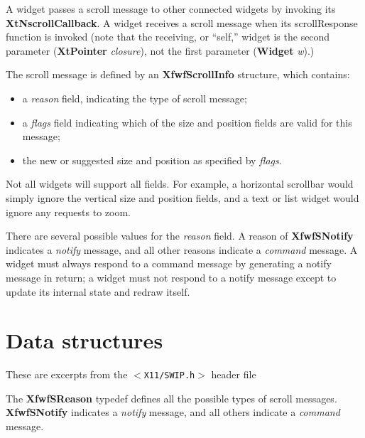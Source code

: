 A widget passes a scroll message to other connected widgets by
invoking its {\bf XtNscrollCallback}.  A widget receives a scroll message
when its scrollResponse function is invoked (note that the receiving,
or ``self,'' widget is the second parameter ({\bf XtPointer} {\it closure}\/),
not the first parameter ({\bf Widget} {\it w}\/).)

The scroll message is defined by an {\bf XfwfScrollInfo} structure, which
contains:

\begin{itemize}

\item
a {\it reason}\/ field, indicating the type of scroll message;

\item
a {\it flags}\/ field indicating which of the size and position
fields are valid for this message;

\item
the new or suggested size and position as specified by {\it flags}.

\end{itemize}

Not all widgets will support all fields.  For example, a horizontal
scrollbar would simply ignore the vertical size and position fields,
and a text or list widget would ignore any requests to zoom.

There are several possible values for the {\it reason}\/ field.  A reason of
{\bf XfwfSNotify} indicates a {\it notify}\/ message, and all other reasons
indicate a {\it command}\/ message.  A widget must always respond to a
command message by generating a notify message in return; a widget
must not respond to a notify message except to update its internal
state and redraw itself.


\section{Data structures}

These are excerpts from the {\tt $<$X11/SWIP.h$>$} header file

\vspace{8pt}
The {\bf XfwfSReason} typedef defines all the possible types
of scroll messages.  {\bf XfwfSNotify} indicates a {\it notify}\/
message, and all others indicate a {\it command}\/ message.

